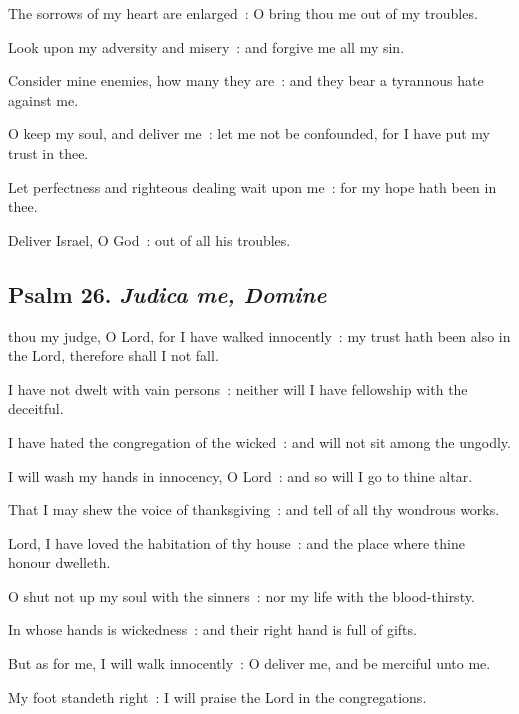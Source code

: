 The sorrows of my heart are enlarged~: O bring thou me out of my troubles.\par
{}Look upon my adversity and misery~: and forgive me all my sin.\par
{}Consider mine enemies, how many they are~: and they bear a tyrannous hate against me.\par
{}O keep my soul, and deliver me~: let me not be confounded, for I have put my trust in thee.\par
{}Let perfectness and righteous dealing wait upon me~: for my hope hath been in thee.\par
{}Deliver Israel, O God~: out of all his troubles.\par

\clearpage
\subsection{Psalm 26. \textit{Judica me, Domine}}


 thou my judge, O Lord, for I have walked innocently~: my trust hath been also in the Lord, therefore shall I not fall.\par
{}
I have not dwelt with vain persons~: neither will I have fellowship with the deceitful.\par
{}I have hated the congregation of the wicked~: and will not sit among the ungodly.\par
{}I will wash my hands in innocency, O Lord~: and so will I go to thine altar.\par
{}That I may shew the voice of thanksgiving~: and tell of all thy wondrous works.\par
{}Lord, I have loved the habitation of thy house~: and the place where thine honour dwelleth.\par
{}O shut not up my soul with the sinners~: nor my life with the blood-thirsty.\par
{}In whose hands is wickedness~: and their right hand is full of gifts.\par
{}But as for me, I will walk innocently~: O deliver me, and be merciful unto me.\par
{}My foot standeth right~: I will praise the Lord in the congregations.\par

